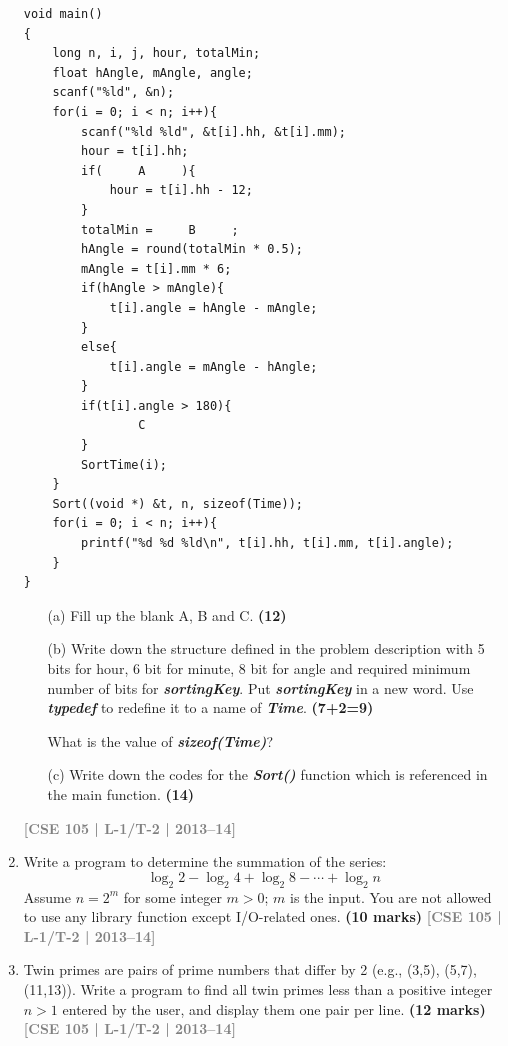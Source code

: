 \documentclass[12pt,a3paper]{article}
\newcommand{\yr}[1]{\hfill\textcolor{gray}{\small\textbf{[#1]}}}
\newcommand{\mk}[1]{\textcolor{orange!70!black}{\small\textbf{(#1 marks)}}}
\begin{document}
\begin{enumerate}
\vspace{0.4cm}
\begin{lstlisting}
void main()
{
    long n, i, j, hour, totalMin;
    float hAngle, mAngle, angle;
    scanf("%ld", &n);
    for(i = 0; i < n; i++){
        scanf("%ld %ld", &t[i].hh, &t[i].mm);
        hour = t[i].hh;
        if(     A     ){
            hour = t[i].hh - 12;
        }
        totalMin =     B     ;
        hAngle = round(totalMin * 0.5);
        mAngle = t[i].mm * 6;
        if(hAngle > mAngle){
            t[i].angle = hAngle - mAngle;
        }
        else{
            t[i].angle = mAngle - hAngle;
        }
        if(t[i].angle > 180){
                C     
        }
        SortTime(i);
    }
    Sort((void *) &t, n, sizeof(Time));
    for(i = 0; i < n; i++){
        printf("%d %d %ld\n", t[i].hh, t[i].mm, t[i].angle);
    }
}
\end{lstlisting}
\vspace{0.4cm}

\begin{enumerate}
    \item[(a)] Fill up the blank A, B and C. \hfill \textbf{(12)}
    
    \item[(b)] Write down the structure defined in the problem description with 5 bits for hour, 6 bit for minute, 8 bit for angle and required minimum number of bits for \textbf{\textit{sortingKey}}. Put \textbf{\textit{sortingKey}} in a new word. Use \textbf{\textit{typedef}} to redefine it to a name of \textbf{\textit{Time}}. \hfill \textbf{(7+2=9)}
    
    \noindent What is the value of \textbf{\textit{sizeof(Time)}}?
    
    \item[(c)] Write down the codes for the \textbf{\textit{Sort()}} function which is referenced in the main function. \hfill \textbf{(14)}
\end{enumerate}
 \yr{CSE 105 | L-1/T-2 | 2013--14}

\item Write a program to determine the summation of the series:
\[ \log_2 2 - \log_2 4 + \log_2 8 - \cdots + \log_2 n \]
Assume $n = 2^m$ for some integer $m > 0$; $m$ is the input. You are not allowed to use any library function except I/O-related ones.
\mk{10} \yr{CSE 105 | L-1/T-2 | 2013--14}

\item Twin primes are pairs of prime numbers that differ by 2 (e.g., (3,5), (5,7), (11,13)). Write a program to find all twin primes less than a positive integer $n > 1$ entered by the user, and display them one pair per line.
\mk{12} \yr{CSE 105 | L-1/T-2 | 2013--14}


\end{enumerate}
\end{document}
